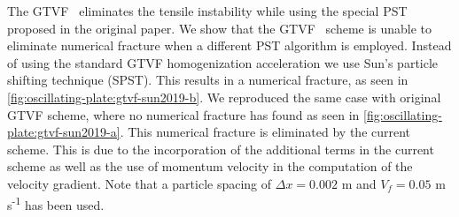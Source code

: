 \documentclass[preprint,12pt]{elsarticle}
\begin{document}
The GTVF~\cite{zhang_hu_adams17} eliminates the tensile instability while
using the special PST proposed in the original paper. We show that the
GTVF~\cite{zhang_hu_adams17} scheme is unable to eliminate numerical fracture
when a different PST algorithm is employed. Instead of using
the standard GTVF homogenization acceleration we use Sun's particle shifting
technique (SPST). This results in a numerical fracture, as seen in
\cref{fig:oscillating-plate:gtvf-sun2019-b}. We reproduced the same case with
original GTVF scheme, where no numerical fracture has found as seen in
\cref{fig:oscillating-plate:gtvf-sun2019-a}. This numerical fracture is
eliminated by the current scheme. This is due to the incorporation of the
additional terms in the current scheme as well as the use of momentum velocity
in the computation of the velocity gradient. Note that a particle spacing of
$\Delta x=0.002$ m and $V_f=0.05$ m\,s\textsuperscript{-1} has been used.
\end{document}
